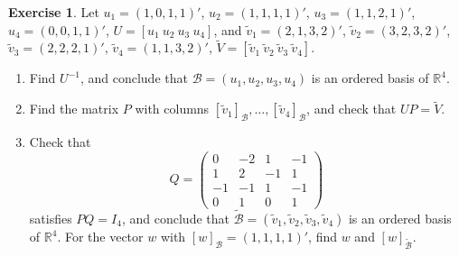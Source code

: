 \documentclass[12pt]{article}
\newcommand{\R}{\mathbb R}
\theoremstyle{definition}
\newtheorem{exercise}{Exercise}
\begin{document}
\begin{exercise}\label{r3-dr-change-basis}
Let \(u_1=(1,0,1,1)'\), \(u_2=(1,1,1,1)'\), \(u_3=(1,1,2,1)'\), \(u_4=(0,0,1,1)'\), \(U=[u_1\ u_2\ u_3\ u_4]\), and
\(\tilde v_1=(2,1,3,2)'\), \(\tilde v_2=(3,2,3,2)'\), \(\tilde v_3=(2,2,2,1)'\), \(\tilde v_4=(1,1,3,2)'\),
\(\tilde V=[\tilde v_1\ \tilde v_2\ \tilde v_3\ \tilde v_4]\).
\begin{enumerate}
\item Find \(U^{-1}\), and conclude that \(\mathcal B=(u_1,u_2,u_3,u_4)\) is an ordered basis of \(\R^4\).
\item Find the matrix \(P\) with columns \([\tilde v_1]_{\mathcal B},\dots,[\tilde v_4]_{\mathcal B}\), and check that
\(UP=\tilde V\).
\item Check that
\[
Q=\begin{pmatrix}0&-2&1&-1\\1&2&-1&1\\-1&-1&1&-1\\0&1&0&1\end{pmatrix}
\]
satisfies \(PQ=I_4\), and conclude that \(\tilde{\mathcal B}=(\tilde v_1,\tilde v_2,\tilde v_3,\tilde v_4)\) is an
ordered basis of \(\R^4\). For the vector \(w\) with \([w]_{\mathcal B}=(1,1,1,1)'\), find \(w\) and
\([w]_{\tilde{\mathcal B}}\).
\end{enumerate}
\end{exercise}
\end{document}
